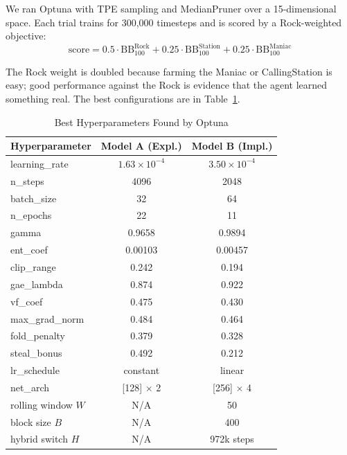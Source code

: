 \documentclass[11pt, conference]{IEEEtran}
\begin{document}
We ran Optuna \cite{akiba2019optuna} with TPE sampling and MedianPruner
over a 15-dimensional space. Each trial trains for 300,000 timesteps
and is scored by a Rock-weighted objective:
\begin{equation}
\text{score} = 0.5 \cdot \text{BB}_{100}^{\text{Rock}}
             + 0.25 \cdot \text{BB}_{100}^{\text{Station}}
             + 0.25 \cdot \text{BB}_{100}^{\text{Maniac}}
\label{eq:hpo_obj}
\end{equation}

The Rock weight is doubled because farming the Maniac or CallingStation
is easy; good performance against the Rock is evidence that the agent
learned something real. The best configurations are in Table~\ref{tab:best_params}.

\begin{table}[htbp]
\caption{Best Hyperparameters Found by Optuna}
\label{tab:best_params}
\centering
\footnotesize
\setlength{\tabcolsep}{4pt}
\begin{tabular}{lcc}
\toprule
\textbf{Hyperparameter} & \textbf{Model A (Expl.)} & \textbf{Model B (Impl.)} \\
\midrule
learning\_rate      & $1.63 \times 10^{-4}$ & $3.50 \times 10^{-4}$ \\
n\_steps            & 4096 & 2048 \\
batch\_size         & 32 & 64 \\
n\_epochs           & 22 & 11 \\
gamma               & 0.9658 & 0.9894 \\
ent\_coef           & 0.00103 & 0.00457 \\
clip\_range         & 0.242 & 0.194 \\
gae\_lambda         & 0.874 & 0.922 \\
vf\_coef            & 0.475 & 0.430 \\
max\_grad\_norm     & 0.484 & 0.464 \\
fold\_penalty       & 0.379 & 0.328 \\
steal\_bonus        & 0.492 & 0.212 \\
lr\_schedule        & constant & linear \\
net\_arch           & [128] $\times$ 2 & [256] $\times$ 4 \\
rolling window $W$ & N/A & 50 \\
block size $B$     & N/A & 400 \\
hybrid switch $H$  & N/A & 972k steps \\
\bottomrule
\end{tabular}
\end{table}
\end{document}
